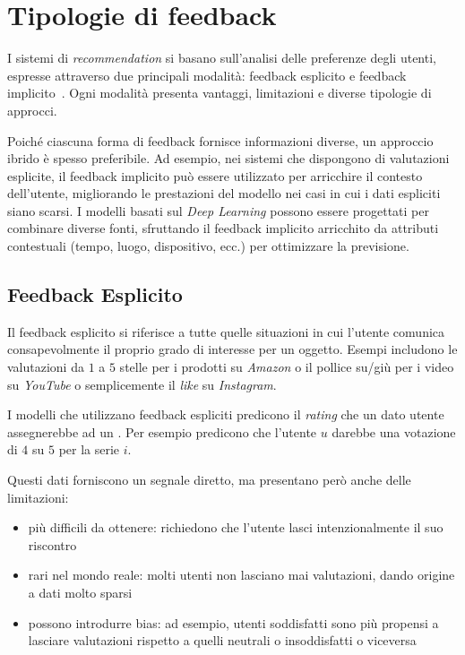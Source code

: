 \section{Tipologie di feedback}

I sistemi di \textit{recommendation} si basano sull'analisi delle preferenze degli utenti, espresse attraverso due principali modalità: feedback esplicito e feedback implicito~\cite{ALS}. Ogni modalità presenta vantaggi, limitazioni e diverse tipologie di approcci. 

Poiché ciascuna forma di feedback fornisce informazioni diverse, un approccio ibrido è spesso preferibile. Ad esempio, nei sistemi che dispongono di valutazioni esplicite, il feedback implicito può essere utilizzato per arricchire il contesto dell'utente, migliorando le prestazioni del modello nei casi in cui i dati espliciti siano scarsi. I modelli basati sul \textit{Deep Learning} possono essere progettati per combinare diverse fonti, sfruttando il feedback implicito arricchito da attributi contestuali (tempo, luogo, dispositivo, ecc.) per ottimizzare la previsione.

\subsection{Feedback Esplicito}

Il feedback esplicito si riferisce a tutte quelle situazioni in cui l'utente comunica consapevolmente il proprio grado di interesse per un oggetto. Esempi includono le valutazioni da $1$ a $5$ stelle per i prodotti su \textit{Amazon} o il pollice su/giù per i video su \textit{YouTube} o semplicemente il \textit{like} su \textit{Instagram}.

I modelli che utilizzano feedback espliciti predicono il \textit{rating} che un dato utente assegnerebbe ad un . Per esempio predicono che l'utente $u$ darebbe una votazione di $4$ su $5$ per la serie $i$.

Questi dati forniscono un segnale diretto, ma presentano però anche delle limitazioni:

\begin{itemize}
    \item più difficili da ottenere: richiedono che l'utente lasci intenzionalmente il suo riscontro
    \item rari nel mondo reale: molti utenti non lasciano mai valutazioni, dando origine a dati molto sparsi
    \item possono introdurre bias: ad esempio, utenti soddisfatti sono più propensi a lasciare valutazioni rispetto a quelli neutrali o insoddisfatti o viceversa
\end{itemize}

